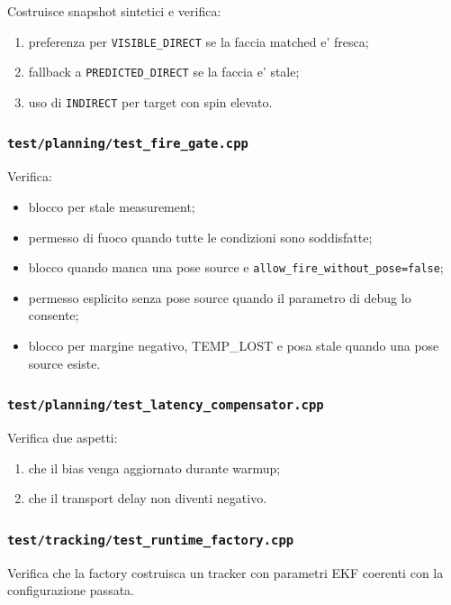 \documentclass[11pt,a4paper]{article}
\newcommand{\code}[1]{\texttt{#1}}
\begin{document}
Costruisce snapshot sintetici e verifica:
\begin{enumerate}[leftmargin=1.4em]
  \item preferenza per \code{VISIBLE\_DIRECT} se la faccia matched e' fresca;
  \item fallback a \code{PREDICTED\_DIRECT} se la faccia e' stale;
  \item uso di \code{INDIRECT} per target con spin elevato.
\end{enumerate}

\subsubsection{\code{test/planning/test\_fire\_gate.cpp}}

Verifica:
\begin{itemize}[leftmargin=1.4em]
  \item blocco per stale measurement;
  \item permesso di fuoco quando tutte le condizioni sono soddisfatte;
  \item blocco quando manca una pose source e \code{allow\_fire\_without\_pose=false};
  \item permesso esplicito senza pose source quando il parametro di debug lo consente;
  \item blocco per margine negativo, TEMP\_LOST e posa stale quando una pose source esiste.
\end{itemize}

\subsubsection{\code{test/planning/test\_latency\_compensator.cpp}}

Verifica due aspetti:
\begin{enumerate}[leftmargin=1.4em]
  \item che il bias venga aggiornato durante warmup;
  \item che il transport delay non diventi negativo.
\end{enumerate}

\subsubsection{\code{test/tracking/test\_runtime\_factory.cpp}}

Verifica che la factory costruisca un tracker con parametri EKF coerenti con la configurazione passata.
\end{document}
